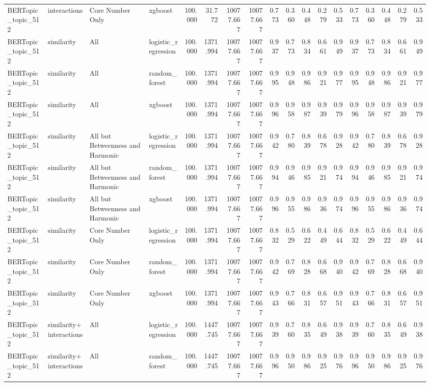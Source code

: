 \begin{tabular}{llllrrrrrrrrrrrrrr}
BERTopic_topic_512 & interactions & Core Number Only & xgboost & 100.000 & 31.772 & 10077.667 & 10077.667 & 0.773 & 0.360 & 0.448 & 0.279 & 0.533 & 0.773 & 0.360 & 0.448 & 0.279 & 0.533 \\
BERTopic_topic_512 & similarity & All & logistic_regression & 100.000 & 1371.994 & 10077.667 & 10077.667 & 0.937 & 0.773 & 0.834 & 0.661 & 0.949 & 0.937 & 0.773 & 0.834 & 0.661 & 0.949 \\
BERTopic_topic_512 & similarity & All & random_forest & 100.000 & 1371.994 & 10077.667 & 10077.667 & 0.995 & 0.948 & 0.986 & 0.921 & 0.977 & 0.995 & 0.948 & 0.986 & 0.921 & 0.977 \\
BERTopic_topic_512 & similarity & All & xgboost & 100.000 & 1371.994 & 10077.667 & 10077.667 & 0.996 & 0.958 & 0.987 & 0.939 & 0.979 & 0.996 & 0.958 & 0.987 & 0.939 & 0.979 \\
BERTopic_topic_512 & similarity & All but Betweenness and Harmonic & logistic_regression & 100.000 & 1371.994 & 10077.667 & 10077.667 & 0.942 & 0.780 & 0.839 & 0.678 & 0.928 & 0.942 & 0.780 & 0.839 & 0.678 & 0.928 \\
BERTopic_topic_512 & similarity & All but Betweenness and Harmonic & random_forest & 100.000 & 1371.994 & 10077.667 & 10077.667 & 0.994 & 0.946 & 0.985 & 0.921 & 0.974 & 0.994 & 0.946 & 0.985 & 0.921 & 0.974 \\
BERTopic_topic_512 & similarity & All but Betweenness and Harmonic & xgboost & 100.000 & 1371.994 & 10077.667 & 10077.667 & 0.996 & 0.955 & 0.986 & 0.936 & 0.974 & 0.996 & 0.955 & 0.986 & 0.936 & 0.974 \\
BERTopic_topic_512 & similarity & Core Number Only & logistic_regression & 100.000 & 1371.994 & 10077.667 & 10077.667 & 0.832 & 0.529 & 0.622 & 0.449 & 0.644 & 0.832 & 0.529 & 0.622 & 0.449 & 0.644 \\
BERTopic_topic_512 & similarity & Core Number Only & random_forest & 100.000 & 1371.994 & 10077.667 & 10077.667 & 0.942 & 0.769 & 0.828 & 0.668 & 0.940 & 0.942 & 0.769 & 0.828 & 0.668 & 0.940 \\
BERTopic_topic_512 & similarity & Core Number Only & xgboost & 100.000 & 1371.994 & 10077.667 & 10077.667 & 0.943 & 0.766 & 0.831 & 0.657 & 0.951 & 0.943 & 0.766 & 0.831 & 0.657 & 0.951 \\
BERTopic_topic_512 & similarity+interactions & All & logistic_regression & 100.000 & 1447.745 & 10077.667 & 10077.667 & 0.939 & 0.760 & 0.835 & 0.649 & 0.938 & 0.939 & 0.760 & 0.835 & 0.649 & 0.938 \\
BERTopic_topic_512 & similarity+interactions & All & random_forest & 100.000 & 1447.745 & 10077.667 & 10077.667 & 0.996 & 0.950 & 0.986 & 0.925 & 0.976 & 0.996 & 0.950 & 0.986 & 0.925 & 0.976 \\

\end{tabular}
